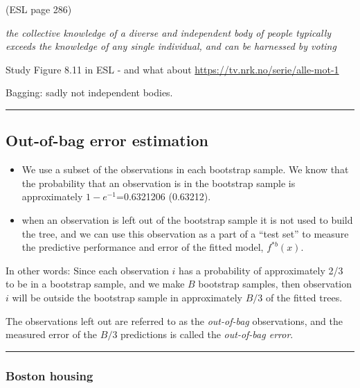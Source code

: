 \documentclass[
  letterpaper,
  DIV=11,
  numbers=noendperiod]{scrartcl}
\providecommand{\tightlist}{%
  \setlength{\itemsep}{0pt}\setlength{\parskip}{0pt}}\usepackage{longtable,booktabs,array}
\begin{document}
(ESL page 286)

\emph{the collective knowledge of a diverse and independent body of
people typically exceeds the knowledge of any single individual, and can
be harnessed by voting}

Study Figure 8.11 in ESL - and what about
\url{https://tv.nrk.no/serie/alle-mot-1}

Bagging: sadly not independent bodies.

\begin{center}\rule{0.5\linewidth}{0.5pt}\end{center}

\hypertarget{out-of-bag-error-estimation}{%
\subsection{Out-of-bag error
estimation}\label{out-of-bag-error-estimation}}

\begin{itemize}
\tightlist
\item
  We use a subset of the observations in each bootstrap sample. We know
  that the probability that an observation is in the bootstrap sample is
  approximately \(1-e^{-1}\)=0.6321206 (0.63212).
\item
  when an observation is left out of the bootstrap sample it is not used
  to build the tree, and we can use this observation as a part of a
  ``test set'' to measure the predictive performance and error of the
  fitted model, \(f^{*b}(x)\).
\end{itemize}

In other words: Since each observation \(i\) has a probability of
approximately 2/3 to be in a bootstrap sample, and we make \(B\)
bootstrap samples, then observation \(i\) will be outside the bootstrap
sample in approximately \(B/3\) of the fitted trees.

The observations left out are referred to as the \emph{out-of-bag}
observations, and the measured error of the \(B/3\) predictions is
called the \emph{out-of-bag error}.

\begin{center}\rule{0.5\linewidth}{0.5pt}\end{center}

\hypertarget{boston-housing}{%
\subsubsection{Boston housing}\label{boston-housing}}
\end{document}
